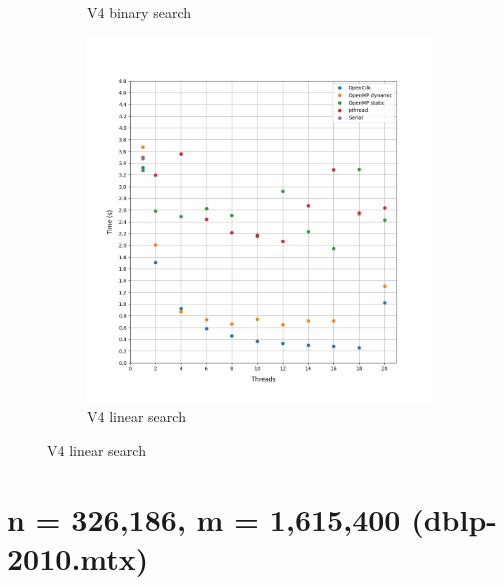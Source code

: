 \documentclass[12pt, a4paper]{article}
\begin{document}
\begin{figure}[h!]
\begin{subfigure}[b]{0.33\textwidth}
         \caption{V4 binary search}
     \end{subfigure}
     \begin{subfigure}[b]{0.33\textwidth}
         \centering
         \includegraphics[height=.4\textheight, width=\textwidth, keepaspectratio]{assets/youtube/v4_linear.png}
         \caption{V4 linear search} 
     \end{subfigure}
\end{figure}

\pagebreak

\section{n = 326,186, m = 1,615,400 (dblp-2010.mtx)}
\end{document}
